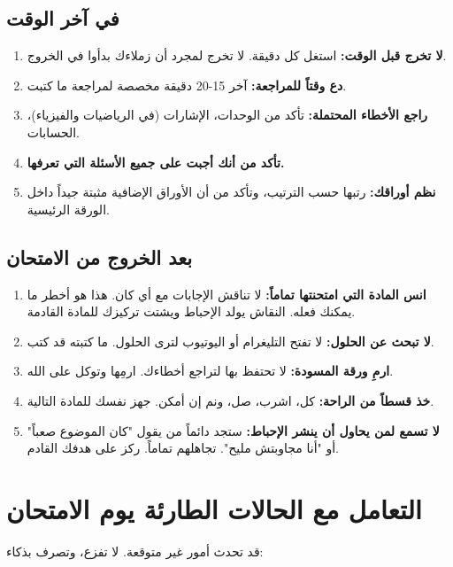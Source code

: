 \documentclass[12pt,a4paper]{book}
\begin{document}
	\subsection{في آخر الوقت}
	\begin{enumerate}
		\item \textbf{لا تخرج قبل الوقت:} استغل كل دقيقة. لا تخرج لمجرد أن زملاءك بدأوا في الخروج.
		\item \textbf{دع وقتاً للمراجعة:} آخر 15-20 دقيقة مخصصة لمراجعة ما كتبت.
		\item \textbf{راجع الأخطاء المحتملة:} تأكد من الوحدات، الإشارات (في الرياضيات والفيزياء)، الحسابات.
		\item \textbf{تأكد من أنك أجبت على جميع الأسئلة التي تعرفها.}
		\item \textbf{نظم أوراقك:} رتبها حسب الترتيب، وتأكد من أن الأوراق الإضافية مثبتة جيداً داخل الورقة الرئيسية.
	\end{enumerate}
	
	\subsection{بعد الخروج من الامتحان}
	\begin{enumerate}
		\item \textbf{انس المادة التي امتحنتها تماماً:} لا تناقش الإجابات مع أي كان. هذا هو أخطر ما يمكنك فعله. النقاش يولد الإحباط ويشتت تركيزك للمادة القادمة.
		\item \textbf{لا تبحث عن الحلول:} لا تفتح التليغرام أو اليوتيوب لترى الحلول. ما كتبته قد كتب.
		\item \textbf{ارمِ ورقة المسودة:} لا تحتفظ بها لتراجع أخطاءك. ارمِها وتوكل على الله.
		\item \textbf{خذ قسطاً من الراحة:} كل، اشرب، صل، ونم إن أمكن. جهز نفسك للمادة التالية.
		\item \textbf{لا تسمع لمن يحاول أن ينشر الإحباط:} ستجد دائماً من يقول "كان الموضوع صعباً" أو "أنا مجاوبتش مليح". تجاهلهم تماماً. ركز على هدفك القادم.
	\end{enumerate}
	
	\section{التعامل مع الحالات الطارئة يوم الامتحان}
	قد تحدث أمور غير متوقعة. لا تفزع، وتصرف بذكاء:
	
\end{document}

